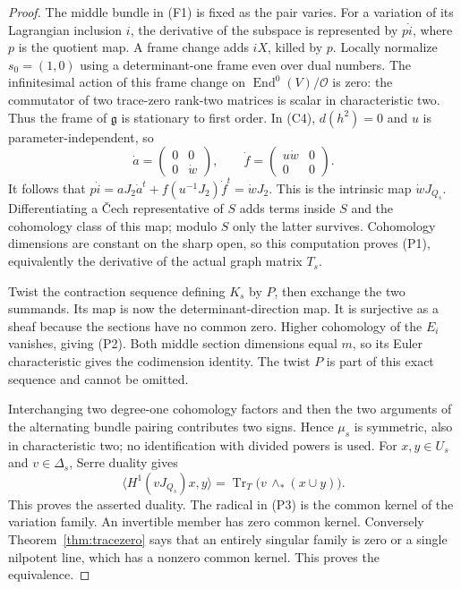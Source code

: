 \documentclass[11pt]{article}
\theoremstyle{definition}\newtheorem{definition}[theorem]{Definition}
\theoremstyle{remark}\newtheorem{remark}[theorem]{Remark}
\newcommand{\OO}{\mathcal O}
\begin{document}
\begin{proof}
The middle bundle in (F1) is fixed as the pair varies. For a variation of its Lagrangian inclusion $i$, the derivative of the subspace is represented by $p\dot i$, where $p$ is the quotient map. A frame change adds $iX$, killed by $p$. Locally normalize $s_0=(1,0)$ using a determinant-one frame even over dual numbers. The infinitesimal action of this frame change on $\operatorname{End}^0(V)/\OO$ is zero: the commutator of two trace-zero rank-two matrices is scalar in characteristic two. Thus the frame of $\mathfrak g$ is stationary to first order. In (C4), $d(h^2)=0$ and $u$ is parameter-independent, so
\[
 \dot a=\begin{pmatrix}0&0\\0&\dot w\end{pmatrix},\qquad
 \dot f=\begin{pmatrix}u\dot w&0\\0&0\end{pmatrix}.
\]
It follows that $p\dot i=aJ_2\dot a^t+f(u^{-1}J_2)\dot f^t=\dot wJ_2$.
This is the intrinsic map $\dot wJ_{Q_s}$. Differentiating a \v Cech representative of $S$ adds terms inside $S$ and the cohomology class of this map; modulo $S$ only the latter survives. Cohomology dimensions are constant on the sharp open, so this computation proves (P1), equivalently the derivative of the actual graph matrix $T_s$.

Twist the contraction sequence defining $K_s$ by $P$, then exchange the two summands. Its map is now the determinant-direction map. It is surjective as a sheaf because the sections have no common zero. Higher cohomology of the $E_i$ vanishes, giving (P2). Both middle section dimensions equal $m$, so its Euler characteristic gives the codimension identity. The twist $P$ is part of this exact sequence and cannot be omitted.

Interchanging two degree-one cohomology factors and then the two arguments of the alternating bundle pairing contributes two signs. Hence $\mu_s$ is symmetric, also in characteristic two; no identification with divided powers is used. For $x,y\in U_s$ and $v\in\Delta_s$, Serre duality gives
\[
 \langle H^1(vJ_{Q_s})x,y\rangle
       =\operatorname{Tr}_T\bigl(v\,\wedge_*(x\cup y)\bigr).
\]
This proves the asserted duality. The radical in (P3) is the common kernel of the variation family. An invertible member has zero common kernel. Conversely Theorem~\ref{thm:tracezero} says that an entirely singular family is zero or a single nilpotent line, which has a nonzero common kernel. This proves the equivalence.
\end{proof}
\end{document}
